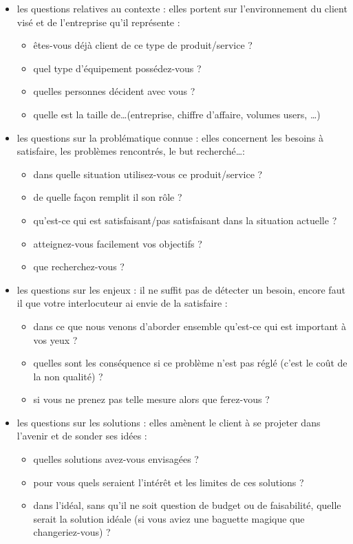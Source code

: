 \documentclass[a4paper, oneside, 12pt, french]{article}
\begin{document}
\begin{fminipage}
\begin{itemize}
    \item les questions relatives au contexte : elles portent sur l'environnement du client visé et de l'entreprise qu'il représente :
    \begin{itemize}
          \item êtes-vous déjà client de ce type de produit/service ?
          \item quel type d'équipement possédez-vous ?
          \item quelles personnes décident avec vous ?
          \item quelle est la taille de\dots (entreprise, chiffre d'affaire, volumes users, \dots)
    \end{itemize}
    \item les questions sur la problématique connue : elles concernent les besoins à satisfaire, les problèmes rencontrés, le but recherché\dots :
    \begin{itemize}
          \item dans quelle situation utilisez-vous ce produit/service ?
          \item de quelle façon remplit il son rôle ?
          \item qu'est-ce qui est satisfaisant/pas satisfaisant dans la situation actuelle ?
          \item atteignez-vous facilement vos objectifs ?
          \item que recherchez-vous ?
    \end{itemize}
    \item les questions sur les enjeux : il ne suffit pas de détecter un besoin, encore faut il que votre interlocuteur ai envie de la satisfaire :
    \begin{itemize}
          \item dans ce que nous venons d'aborder ensemble qu'est-ce qui est important à vos yeux ?
          \item quelles sont les conséquence si ce problème n'est pas réglé (c'est le coût de la non qualité) ?
          \item si vous ne prenez pas telle mesure alors que ferez-vous ?
    \end{itemize}
    \item les questions sur les solutions : elles amènent le client à se projeter dans l'avenir et de sonder ses idées :
    \begin{itemize}
          \item quelles solutions avez-vous envisagées ?
          \item pour vous quels seraient l'intérêt et les limites de ces solutions ?
          \item dans l'idéal, sans qu'il ne soit question de budget ou de faisabilité, quelle serait la solution idéale (si vous aviez une baguette magique que changeriez-vous) ?
    \end{itemize}
\end{itemize}

\end{fminipage}
\end{document}
